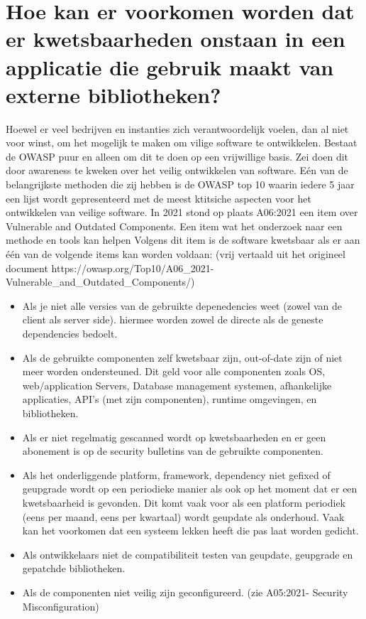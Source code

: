 \section{Hoe kan er voorkomen worden dat er kwetsbaarheden onstaan in een applicatie die gebruik maakt van externe bibliotheken?}\label{sec:hoe-kan-er-voorkomen-worden-dat-er-kkwetsbaarheden-onstaan-in-een-applicatie-die-gebruik-maakt-van-externe-bibliotheken?}
Hoewel er veel bedrijven en instanties zich verantwoordelijk voelen, dan al niet voor winst, om het mogelijk te maken om vilige software te ontwikkelen. Bestaat de OWASP puur en alleen om dit te doen op een vrijwillige basis. Zei doen dit door awareness te kweken over het veilig ontwikkelen van software. Eén van de belangrijkste methoden die zij hebben is de OWASP top 10 waarin iedere 5 jaar een lijst wordt gepresenteerd met de meest ktitsiche aspecten voor het ontwikkelen van veilige software. In 2021 stond op plaats A06:2021 een item over Vulnerable and Outdated Components. Een item wat het onderzoek naar een methode en tools kan helpen Volgens dit item is de software kwetsbaar als er aan één van de volgende items kan worden voldaan: (vrij vertaald uit het origineel document https://owasp.org/Top10/A06\_2021-Vulnerable\_and\_Outdated\_Components/)
\begin{itemize}
    \item Als je niet alle versies van de gebruikte depenedencies weet (zowel van de client als server side). hiermee worden zowel de directe als de geneste dependencies bedoelt.
    \item Als de gebruikte componenten zelf kwetsbaar zijn, out-of-date zijn of niet meer worden ondersteuned. Dit geld voor alle componenten zoals OS, web/application Servers, Database management systemen, afhankelijke applicaties, API's (met zijn componenten), runtime omgevingen, en bibliotheken.
    \item Als er niet regelmatig gescanned wordt op kwetsbaarheden en er geen abonement is op de security bulletins van de gebruikte componenten.
    \item Als het onderliggende platform, framework, dependency niet gefixed of geupgrade wordt op een periodieke manier als ook op het moment dat er een kwetsbaarheid is gevonden. Dit komt vaak voor als een platform periodiek (eens per maand, eens per kwartaal) wordt geupdate als onderhoud. Vaak kan het voorkomen dat een systeem lekken heeft die pas laat worden gedicht.
    \item Als ontwikkelaars niet de compatibiliteit testen van geupdate, geupgrade en gepatchde bibliotheken.
    \item Als de componenten niet veilig zijn geconfigureerd. (zie A05:2021- Security Misconfiguration)
\end{itemize}

